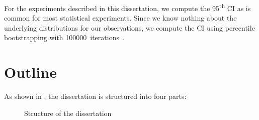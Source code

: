 For the experiments described in this dissertation, we compute the
\num{95}\textsuperscript{th} \gls{CI} as is common for most statistical
experiments.
%
Since we know nothing about the underlying distributions for our observations,
we compute the \gls{CI} using \gls{percentile bootstrapping} with
\num{100000}~iterations~\cite{EfronTibshirani:1994}.


\section{Outline}

As shown in , the dissertation is structured
into four parts:
%
\begin{figure}
  \centering%
  

  \caption{Structure of the dissertation}
\end{figure}
%
